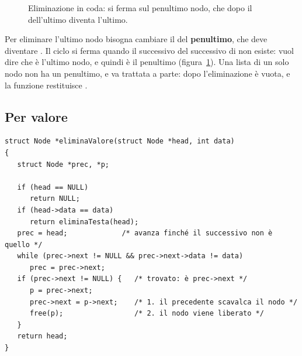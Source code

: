 \begin{figure}[H]
  \centering
  \caption{Eliminazione in coda:  si ferma sul penultimo nodo, che
           dopo il  dell'ultimo diventa l'ultimo.}
  \label{fig:el-coda}
\end{figure}

Per eliminare l'ultimo nodo bisogna cambiare il  del
\textbf{penultimo}, che deve diventare . Il ciclo si ferma quando
il successivo del successivo di  non esiste:
 vuol dire che  è l'ultimo nodo,
e quindi  è il penultimo (figura~\ref{fig:el-coda}). Una lista di un
solo nodo non ha un penultimo, e va trattata a parte: dopo l'eliminazione è
vuota, e la funzione restituisce .

\subsection{Per valore}

\begin{lstlisting}[style=c, name=lista.c]
struct Node *eliminaValore(struct Node *head, int data)
{
   struct Node *prec, *p;

   if (head == NULL)
      return NULL;
   if (head->data == data)
      return eliminaTesta(head);
   prec = head;             /* avanza finché il successivo non è quello */
   while (prec->next != NULL && prec->next->data != data)
      prec = prec->next;
   if (prec->next != NULL) {   /* trovato: è prec->next */
      p = prec->next;
      prec->next = p->next;    /* 1. il precedente scavalca il nodo */
      free(p);                 /* 2. il nodo viene liberato */
   }
   return head;
}
\end{lstlisting}

